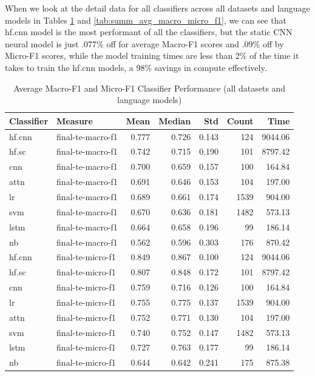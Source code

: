 \documentclass[final]{clv2025-revised}
\begin{document}
When we look at the detail data for all classifiers across all datasets and language models in Tables \ref{tab:avg_macro_micro_f1} and \ref{tab:summ_avg_macro_micro_f1}, we can see that hf.cnn model is the most performant of all the classifiers, but the static CNN neural model is just .077\% off for average Macro-F1 scores and .09\% off by Micro-F1 scores, while the model training times are less than 2\% of the time it takes to train the hf.cnn models, a 98\% savings in compute effectively.

\begin{table}[h!]
\centering
\scriptsize
\caption{Average Macro-F1 and Micro-F1 Classifier Performance (all datasets and language models)}
\label{tab:avg_macro_micro_f1}
\begin{tabular}{@{}p{1.2cm}p{2.3cm}rrrrr@{}}
\toprule
\textbf{Classifier} & \textbf{Measure} & \textbf{Mean} & \textbf{Median} & \textbf{Std} & \textbf{Count} & \textbf{Time} \\
\midrule
hf.cnn & final-te-macro-f1 & 0.777 & 0.726 & 0.143 & 124 & 9044.06 \\
hf.sc  & final-te-macro-f1 & 0.742 & 0.715 & 0.190 & 101 & 8797.42 \\
cnn    & final-te-macro-f1 & 0.700 & 0.659 & 0.157 & 100 & 164.84 \\
attn   & final-te-macro-f1 & 0.691 & 0.646 & 0.153 & 104 & 197.00 \\
lr     & final-te-macro-f1 & 0.689 & 0.661 & 0.174 & 1539 & 904.00 \\
svm    & final-te-macro-f1 & 0.670 & 0.636 & 0.181 & 1482 & 573.13 \\
lstm   & final-te-macro-f1 & 0.664 & 0.658 & 0.196 & 99 & 186.14 \\
nb     & final-te-macro-f1 & 0.562 & 0.596 & 0.303 & 176 & 870.42 \\
\midrule
hf.cnn & final-te-micro-f1 & 0.849 & 0.867 & 0.100 & 124 & 9044.06 \\
hf.sc  & final-te-micro-f1 & 0.807 & 0.848 & 0.172 & 101 & 8797.42 \\
cnn    & final-te-micro-f1 & 0.759 & 0.716 & 0.126 & 100 & 164.84 \\
lr     & final-te-micro-f1 & 0.755 & 0.775 & 0.137 & 1539 & 904.00 \\
attn   & final-te-micro-f1 & 0.752 & 0.771 & 0.130 & 104 & 197.00 \\
svm    & final-te-micro-f1 & 0.740 & 0.752 & 0.147 & 1482 & 573.13 \\
lstm   & final-te-micro-f1 & 0.727 & 0.763 & 0.177 & 99 & 186.14 \\
nb     & final-te-micro-f1 & 0.644 & 0.642 & 0.241 & 175 & 875.38 \\
\bottomrule
\end{tabular}
\end{table}
\end{document}
